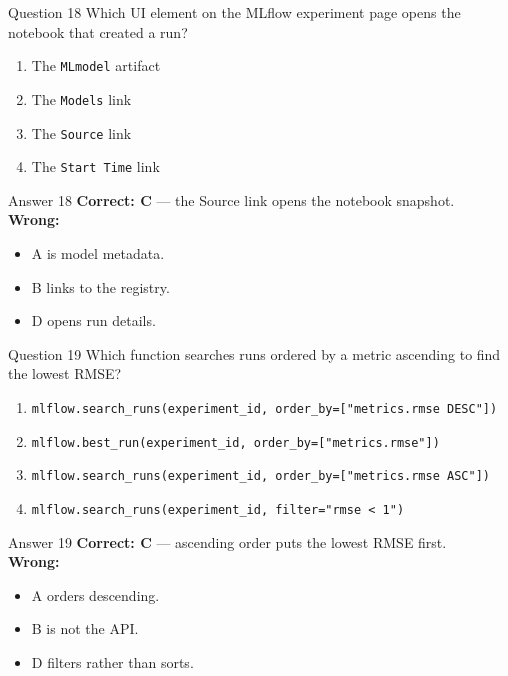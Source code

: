 \documentclass[aspectratio=169,11pt]{beamer}
\begin{document}
	\begin{frame}{Question 18}
		Which UI element on the MLflow experiment page opens the notebook that created a run?
		\begin{enumerate}[label=\Alph*.]
			\item The \texttt{MLmodel} artifact
			\item The \texttt{Models} link
			\item The \texttt{Source} link
			\item The \texttt{Start Time} link
		\end{enumerate}
	\end{frame}
	\begin{frame}{Answer 18}
		\textbf{Correct: C} --- the Source link opens the notebook snapshot.\\
		\vspace{0.5em}
		\textbf{Wrong:}
		\begin{itemize}
			\item A is model metadata.
			\item B links to the registry.
			\item D opens run details.
		\end{itemize}
	\end{frame}
	
	\begin{frame}{Question 19}
		Which function searches runs ordered by a metric ascending to find the lowest RMSE?
		\begin{enumerate}[label=\Alph*.]
			\item \texttt{mlflow.search\_runs(experiment\_id, order\_by=["metrics.rmse DESC"])}
			\item \texttt{mlflow.best\_run(experiment\_id, order\_by=["metrics.rmse"])}
			\item \texttt{mlflow.search\_runs(experiment\_id, order\_by=["metrics.rmse ASC"])}
			\item \texttt{mlflow.search\_runs(experiment\_id, filter="rmse < 1")}
		\end{enumerate}
	\end{frame}
	\begin{frame}{Answer 19}
		\textbf{Correct: C} --- ascending order puts the lowest RMSE first.\\
		\vspace{0.5em}
		\textbf{Wrong:}
		\begin{itemize}
			\item A orders descending.
			\item B is not the API.
			\item D filters rather than sorts.
		\end{itemize}
	\end{frame}
	
\end{document}
